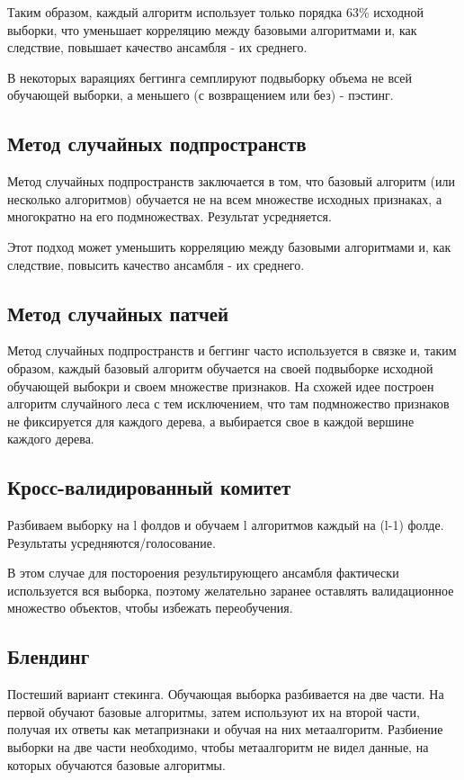 Таким образом, каждый алгоритм использует только порядка 63\% исходной выборки, что уменьшает корреляцию между базовыми алгоритмами и, как следствие, повышает качество ансамбля - их среднего.

В некоторых вараяциях беггинга семплируют подвыборку объема не всей обучающей выборки, а меньшего (с возвращением или без) - пэстинг.  

\subsection{Метод случайных подпространств}

Метод случайных подпространств заключается в том, что базовый алгоритм (или несколько алгоритмов) обучается не на всем множестве исходных признаках, а многократно на его подмножествах. Результат усредняется.

Этот подход может уменьшить корреляцию между базовыми алгоритмами и, как следствие, повысить качество ансамбля - их среднего.

\subsection{Метод случайных патчей}

Метод случайных подпространств и беггинг часто используется в связке и, таким образом, каждый базовый алгоритм обучается на своей подвыборке исходной обучающей выбокри и своем множестве признаков. На схожей идее построен алгоритм случайного леса с тем исключением, что там подмножество признаков не фиксируется для каждого дерева, а выбирается свое в каждой вершине каждого дерева.

\subsection{Кросс-валидированный комитет}

Разбиваем выборку на l фолдов и обучаем l алгоритмов каждый на (l-1) фолде. Результаты усредняются/голосование.

В этом случае для постороения результирующего ансамбля фактически используется вся выборка, поэтому желательно заранее оставлять валидационное множество объектов, чтобы избежать переобучения. 

\subsection{Блендинг}

Постеший вариант стекинга. Обучающая выборка разбивается на две части. На первой обучают базовые алгоритмы, затем используют их на второй части, получая их ответы как метапризнаки и обучая на них метаалгоритм. Разбиение выборки на две части необходимо, чтобы метаалгоритм не видел данные, на которых обучаются базовые алгоритмы.

